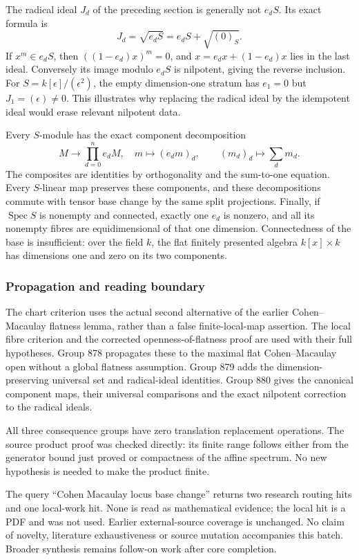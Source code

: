 The radical ideal \(J_d\) of the preceding section is generally not \(e_dS\). Its exact formula is \[
J_d=\sqrt{e_dS}=e_dS+\sqrt{(0)_S}.
\] If \(x^m\in e_dS\), then \(((1-e_d)x)^m=0\), and \(x=e_dx+(1-e_d)x\) lies in the last ideal. Conversely its image modulo \(e_dS\) is nilpotent, giving the reverse inclusion. For \(S=k[\epsilon]/(\epsilon^2)\), the empty dimension-one stratum has \(e_1=0\) but \(J_1=(\epsilon)\ne0\). This illustrates why replacing the radical ideal by the idempotent ideal would erase relevant nilpotent data.

Every \(S\)-module has the exact component decomposition \[
M\longrightarrow\prod_{d=0}^n e_dM,\quad m\longmapsto(e_dm)_d,
\qquad (m_d)_d\longmapsto\sum_d m_d.
\] The composites are identities by orthogonality and the sum-to-one equation. Every \(S\)-linear map preserves these components, and these decompositions commute with tensor base change by the same split projections. Finally, if \(\operatorname{Spec}S\) is nonempty and connected, exactly one \(e_d\) is nonzero, and all its nonempty fibres are equidimensional of that one dimension. Connectedness of the base is insufficient: over the field \(k\), the flat finitely presented algebra \(k[x]\times k\) has dimensions one and zero on its two components.

\subsubsection{Propagation and reading boundary}\label{algebra-proof-040-propagation-and-reading-boundary}

The chart criterion uses the actual second alternative of the earlier Cohen--Macaulay flatness lemma, rather than a false finite-local-map assertion. The local fibre criterion and the corrected openness-of-flatness proof are used with their full hypotheses. Group 878 propagates these to the maximal flat Cohen--Macaulay open without a global flatness assumption. Group 879 adds the dimension-preserving universal set and radical-ideal identities. Group 880 gives the canonical component maps, their universal comparisons and the exact nilpotent correction to the radical ideals.

All three consequence groups have zero translation replacement operations. The source product proof was checked directly: its finite range follows either from the generator bound just proved or compactness of the affine spectrum. No new hypothesis is needed to make the product finite.

The query ``Cohen Macaulay locus base change'' returns two research routing hits and one local-work hit. None is read as mathematical evidence; the local hit is a PDF and was not used. Earlier external-source coverage is unchanged. No claim of novelty, literature exhaustiveness or source mutation accompanies this batch. Broader synthesis remains follow-on work after core completion.
